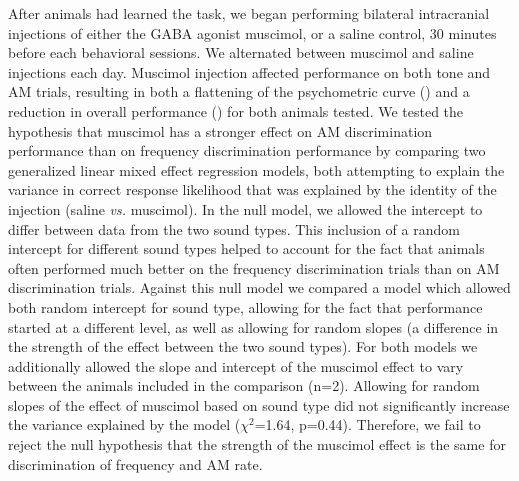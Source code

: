 After animals had learned the task, we began performing
bilateral intracranial injections of either the GABA agonist muscimol, or a
saline control, 30 minutes before each behavioral sessions.
%
We alternated between muscimol and saline injections each day. 
%
Muscimol injection affected performance on both tone and AM trials, resulting
in both a flattening of the psychometric curve (\fig{\amodPsychometrics}) and a
reduction in overall performance (\fig{\amodCorrect}) for both animals tested. 
%
We tested the hypothesis that muscimol has a stronger effect on AM
discrimination performance than on frequency discrimination performance by
comparing two generalized linear mixed effect regression models, both attempting
to explain the variance in correct response likelihood that was explained by the
identity of the injection (saline \emph{vs.} muscimol). 
%
In the null model, we allowed the intercept to differ between data from the two
sound types.
%
This inclusion of a random intercept for different sound types helped to account for the fact that animals often performed much better on the
frequency discrimination trials than on AM discrimination trials.
%
Against this null model we compared a model which allowed both random
intercept for sound type, allowing for the fact that performance started
at a different level, as well as allowing for random slopes (a difference in
the strength of the effect between the two sound types).
%
For both models we additionally allowed the slope and intercept of the muscimol
effect to vary between the animals included in the comparison (n=2). 
%
Allowing for random slopes of the effect of muscimol based on sound type did
not significantly increase the variance explained by the model
($\chi^{2}$=1.64, p=0.44).
%
Therefore, we fail to reject the null hypothesis that the strength of the
muscimol effect is the same for discrimination of frequency and AM rate. 

